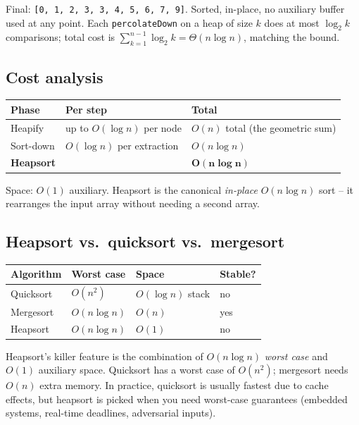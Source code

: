 \documentclass[11pt]{article}
\begin{document}
\begin{examplebox}
Final: \texttt{[0, 1, 2, 3, 3, 4, 5, 6, 7, 9]}. Sorted, in-place, no
auxiliary buffer used at any point. Each \texttt{percolateDown} on a
heap of size $k$ does at most $\log_2 k$ comparisons; total cost is
$\sum_{k=1}^{n-1} \log_2 k = \Theta(n \log n)$, matching the bound.
\end{examplebox}

\subsection*{Cost analysis}

\begin{center}
\begin{tabular}{lll}
Phase & Per step & Total \\
\hline
Heapify              & up to $O(\log n)$ per node & $O(n)$ total (the geometric sum) \\
Sort-down            & $O(\log n)$ per extraction & $O(n \log n)$ \\
\hline
\textbf{Heapsort}    & & $\mathbf{O(n \log n)}$ \\
\end{tabular}
\end{center}

Space: $O(1)$ auxiliary. Heapsort is the canonical \emph{in-place} $O(n \log n)$ sort -- it rearranges the input array without needing a second array.

\subsection*{Heapsort vs.\ quicksort vs.\ mergesort}

\begin{center}
\begin{tabular}{llll}
Algorithm & Worst case & Space & Stable? \\
\hline
Quicksort   & $O(n^2)$      & $O(\log n)$ stack & no \\
Mergesort   & $O(n \log n)$ & $O(n)$            & yes \\
Heapsort    & $O(n \log n)$ & $O(1)$            & no \\
\end{tabular}
\end{center}

Heapsort's killer feature is the combination of $O(n \log n)$ \emph{worst case} and $O(1)$ auxiliary space. Quicksort has a worst case of $O(n^2)$; mergesort needs $O(n)$ extra memory. In practice, quicksort is usually fastest due to cache effects, but heapsort is picked when you need worst-case guarantees (embedded systems, real-time deadlines, adversarial inputs).
\end{document}
